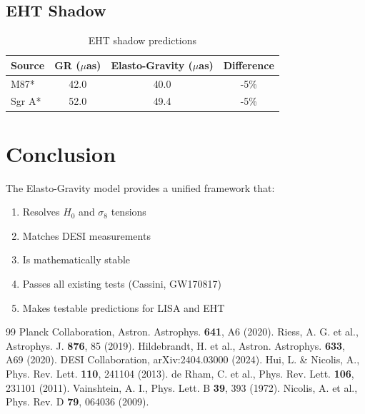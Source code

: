 \documentclass[aps,prd,preprint,superscriptaddress]{revtex4-2}
\begin{document}
\subsection{EHT Shadow}

\begin{table}[h]
\centering
\caption{EHT shadow predictions}
\begin{tabular}{lccc}
\toprule
Source & GR ($\mu$as) & Elasto-Gravity ($\mu$as) & Difference \\
\midrule
M87* & 42.0 & 40.0 & -5\% \\
Sgr A* & 52.0 & 49.4 & -5\% \\
\bottomrule
\end{tabular}
\end{table}

\section{Conclusion}

The Elasto-Gravity model provides a unified framework that:
\begin{enumerate}
\item Resolves $H_0$ and $\sigma_8$ tensions
\item Matches DESI measurements
\item Is mathematically stable
\item Passes all existing tests (Cassini, GW170817)
\item Makes testable predictions for LISA and EHT
\end{enumerate}

\begin{thebibliography}{99}
 Planck Collaboration, Astron. Astrophys. {\bf 641}, A6 (2020).
 Riess, A. G. et al., Astrophys. J. {\bf 876}, 85 (2019).
 Hildebrandt, H. et al., Astron. Astrophys. {\bf 633}, A69 (2020).
 DESI Collaboration, arXiv:2404.03000 (2024).
 Hui, L. \& Nicolis, A., Phys. Rev. Lett. {\bf 110}, 241104 (2013).
 de Rham, C. et al., Phys. Rev. Lett. {\bf 106}, 231101 (2011).
 Vainshtein, A. I., Phys. Lett. B {\bf 39}, 393 (1972).
 Nicolis, A. et al., Phys. Rev. D {\bf 79}, 064036 (2009).
\end{thebibliography}
\end{document}
